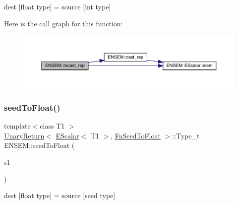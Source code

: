 dest \mbox{[}float type\mbox{]} = source \mbox{[}int type\mbox{]} 

Here is the call graph for this function\+:
\nopagebreak
\begin{figure}[H]
\begin{center}
\leavevmode
\includegraphics[width=350pt]{d4/dca/group__escalar_ga49ac1b22b18f5dd54cdf91fbf9a4e3b2_cgraph}
\end{center}
\end{figure}
\mbox{\label{group__escalar_ga7e479d7cf5ca7620a11e78b407b2e9c3}} 
\subsubsection{\texorpdfstring{seedToFloat()}{seedToFloat()}}
{\footnotesize\ttfamily template$<$class T1 $>$ \\
\mbox{\hyperlink{structENSEM_1_1UnaryReturn}{Unary\+Return}}$<$ \mbox{\hyperlink{classENSEM_1_1EScalar}{E\+Scalar}}$<$ T1 $>$, \mbox{\hyperlink{structENSEM_1_1FnSeedToFloat}{Fn\+Seed\+To\+Float}} $>$\+::Type\+\_\+t E\+N\+S\+E\+M\+::seed\+To\+Float (\begin{DoxyParamCaption}\item[{const \mbox{\hyperlink{classENSEM_1_1EScalar}{E\+Scalar}}$<$ T1 $>$ \&}]{s1 }\end{DoxyParamCaption})\hspace{0.3cm}{\ttfamily [inline]}}



dest \mbox{[}float type\mbox{]} = source \mbox{[}seed type\mbox{]} 

